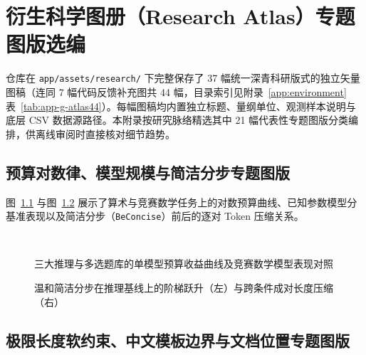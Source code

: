 \chapter{衍生科学图册（Research Atlas）专题图版选编}\label{app:atlas}

仓库在 \texttt{app/assets/research/} 下完整保存了 37 幅统一深青科研版式的独立矢量图稿（连同 7 幅代码反馈补充图共 44 幅，目录索引见附录~\ref{app:environment} 表~\ref{tab:app-g-atlas44}）。每幅图稿均内置独立标题、量纲单位、观测样本说明与底层 CSV 数据源路径。本附录按研究脉络精选其中 21 幅代表性专题图版分类编排，供离线审阅时直接核对细节趋势。

\section{预算对数律、模型规模与简洁分步专题图版}

图~\ref{fig:app-i-budget} 与图~\ref{fig:app-i-concise} 展示了算术与竞赛数学任务上的对数预算曲线、已知参数模型分基准表现以及简洁分步（\texttt{BeConcise}）前后的逐对 Token 压缩关系。

\begin{figure}[!htbp]
\centering
{}\hfill
{}\\[6pt]
\hfill
{}
\caption{三大推理与多选题库的单模型预算收益曲线及竞赛数学模型表现对照}
\label{fig:app-i-budget}
\end{figure}

\begin{figure}[!htbp]
\centering
{}\hfill
{}
\caption{温和简洁分步在推理基线上的阶梯跃升（左）与跨条件成对长度压缩（右）}
\label{fig:app-i-concise}
\end{figure}

\section{极限长度软约束、中文模板边界与文档位置专题图版}

